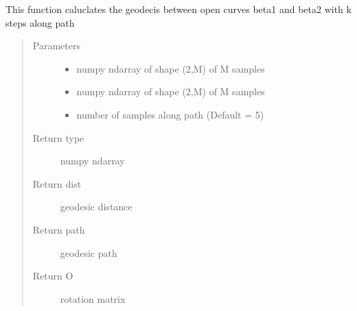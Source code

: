\documentclass[letterpaper,10pt,english]{sphinxmanual}
\begin{document}

\begin{fulllineitems}
\label{\detokenize{geodesic:geodesic.geod_sphere}}
This function caluclates the geodecis between open curves beta1 and
beta2 with k steps along path
\begin{quote}\begin{description}
\item[{Parameters}] \leavevmode\begin{itemize}
\item {} 
 \textendash{} numpy ndarray of shape (2,M) of M samples

\item {} 
 \textendash{} numpy ndarray of shape (2,M) of M samples

\item {} 
 \textendash{} number of samples along path (Default = 5)

\end{itemize}

\item[{Return type}] \leavevmode
numpy ndarray

\item[{Return dist}] \leavevmode
geodesic distance

\item[{Return path}] \leavevmode
geodesic path

\item[{Return O}] \leavevmode
rotation matrix

\end{description}\end{quote}

\end{fulllineitems}

\end{document}
